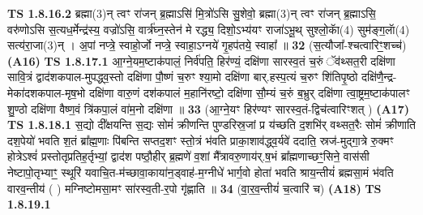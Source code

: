 \documentclass[17pt]{extarticle}
\begin{document}
                  \newline
                                \textbf{ TS 1.8.16.2} \newline
                  ब्रह्मा(3)न् त्वꣳ रा॑जन् ब्र॒ह्माऽसि॑ मि॒त्रो॑ऽसि सु॒शेवो॒ ब्रह्मा(3)न् त्वꣳ रा॑जन् ब्र॒ह्माऽसि॒ वरु॑णोऽसि स॒त्यध॒र्मेन्द्र॑स्य॒ वज्रो॑ऽसि॒ वार्त्र॑घ्न॒स्तेन॑ मे रद्ध्य॒ दिशो॒ऽभ्य॑यꣳ राजा॑ऽभू॒थ् सुश्लो॒काॅ(4) सुम॑ङ्ग॒लाॅ(4) सत्य॑रा॒जा(3)न् । अ॒पां नप्त्रे॒ स्वाहो॒र्जो नप्त्रे॒ स्वाहा॒ऽग्नये॑ गृ॒हप॑तये॒ स्वाहा᳚ ॥ \textbf{  32 } \newline
                  \newline
                      (स॒त्यौजा᳚-श्चत्वारिꣳ॒॒शच्च॑)  \textbf{(A16)} \newline \newline
                                        \textbf{ TS 1.8.17.1} \newline
                  आ॒ग्ने॒यम॒ष्टाक॑पालं॒ निर्व॑पति॒ हिर॑ण्यं॒ दक्षि॑णा सारस्व॒तं च॒रुं ॅव॑थ्सत॒री दक्षि॑णा सावि॒त्रं द्वाद॑शकपाल-मुपद्ध्व॒स्तो दक्षि॑णा पौ॒ष्णं च॒रुꣳ श्या॒मो दक्षि॑णा बार्.हस्प॒त्यं च॒रुꣳ शि॑तिपृ॒ष्ठो दक्षि॑णै॒न्द्र-मेका॑दशकपाल-मृष॒भो दक्षि॑णा वारु॒णं दश॑कपालं म॒हानि॑रष्टो॒ दक्षि॑णा सौ॒म्यं च॒रुं ब॒भ्रुर् दक्षि॑णा त्वा॒ष्ट्रम॒ष्टाक॑पालꣳ शु॒ण्ठो दक्षि॑णा वैष्ण॒वं त्रि॑कपा॒लं वा॑म॒नो दक्षि॑णा ॥ \textbf{  33} \newline
                  \newline
                      (आ॒ग्ने॒यꣳ हिर॑ण्यꣳ सारस्व॒तं-द्विच॑त्वारिꣳशत् )  \textbf{(A17)} \newline \newline
                                        \textbf{ TS 1.8.18.1} \newline
                  स॒द्यो दी᳚क्षयन्ति स॒द्यः सोमं॑ क्रीणन्ति पुण्डरिस्र॒जां प्र य॑च्छति द॒शभि॑र् वथ्सत॒रैः सोमं॑ क्रीणाति दश॒पेयो॑ भवति श॒तं ब्रा᳚ह्म॒णाः पि॑बन्ति सप्तद॒शꣳ स्तो॒त्रं भ॑वति प्राका॒शाव॑द्ध्व॒र्यवे॑ ददाति॒ स्रज॑-मुद्गा॒त्रे रु॒क्मꣳ होत्रेऽश्वं॑ प्रस्तोतृप्रतिह॒र्तृभ्यां॒ द्वाद॑श पष्ठौ॒हीर् ब्र॒ह्मणे॑ व॒शां मै᳚त्रावरु॒णाय॑र्.ष॒भं ब्रा᳚ह्मणाच्छꣳ॒॒सिने॒ वास॑सी नेष्टापो॒तृभ्याꣳ॒॒ स्थूरि॑ यवाचि॒त-म॑च्छावा॒काया॑न॒ड्वाह॑-म॒ग्नीधे॑ भार्ग॒वो होता॑ भवति श्राय॒न्तीयं॑ ब्रह्मसा॒मं भ॑वति वारव॒न्तीय॑ ( ) मग्निष्टोमसा॒मꣳ सा॑रस्व॒ती-र॒पो गृ॑ह्णाति ॥ \textbf{  34 } \newline
                  \newline
                      (वा॒॒र॒व॒न्तीयं॑ च॒त्वारि॑ च) \textbf{(A18)} \newline \newline
                                        \textbf{ TS 1.8.19.1} \newline
\end{document}

